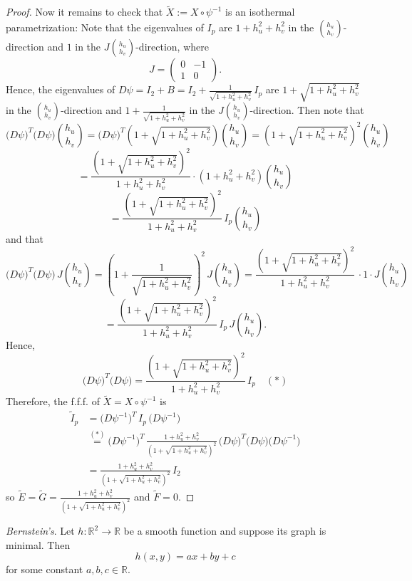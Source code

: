 \begin{proof}
\noindent Now it remains to check that $\widetilde{X} := X\circ\psi^{-1}$ is an isothermal parametrization: Note that the eigenvalues of $I_p$ are $1 + h_u^2 + h_v^2$ in the $\binom{h_u}{h_v}$-direction and $1$ in the $J\binom{h_u}{h_v}$-direction, where
\[
J = \begin{pmatrix}0 & -1\\ 1 & 0\end{pmatrix}.
\]
Hence, the eigenvalues of $D\psi = I_2 + B = I_2 + \frac{1}{\sqrt{1 + h_u^2 + h_v^2}}\,I_p$ are $1 + \sqrt{1 + h_u^2 + h_v^2}$ in the $\binom{h_u}{h_v}$-direction and $1 + \frac{1}{\sqrt{1 + h_u^2 + h_v^2}}$ in the $J\binom{h_u}{h_v}$-direction. Then note that
\[
\big(D\psi\big)^T\big(D\psi\big)\binom{h_u}{h_v} = \big(D\psi\big)^T\left(1 + \sqrt{1 + h_u^2 + h_v^2}\right)\binom{h_u}{h_v} = \left(1 + \sqrt{1 + h_u^2 + h_v^2}\right)^2\binom{h_u}{h_v}
\]
\[
= \frac{\left(1 + \sqrt{1 + h_u^2 + h_v^2}\right)^2}{1 + h_u^2 + h_v^2}\cdot\left(1 + h_u^2 + h_v^2\right)\binom{h_u}{h_v}
\]
\[
= \frac{\left(1 + \sqrt{1 + h_u^2 + h_v^2}\right)^2}{1 + h_u^2 + h_v^2}\,I_p\binom{h_u}{h_v}
\]
and that
\[
\big(D\psi\big)^T\big(D\psi\big)\,J\binom{h_u}{h_v} = \left(1 + \frac{1}{\sqrt{1 + h_u^2 + h_v^2}}\right)^2\,J\binom{h_u}{h_v} = \frac{\left(1 + \sqrt{1 + h_u^2 + h_v^2}\right)^2}{1 + h_u^2 + h_v^2}\, \cdot1\cdot J\binom{h_u}{h_v}
\]
\[
= \frac{\left(1 + \sqrt{1 + h_u^2 + h_v^2}\right)^2}{1 + h_u^2 + h_v^2}\,I_p\,J\binom{h_u}{h_v}.
\]
Hence,
\[
\big(D\psi\big)^T\big(D\psi\big) = \frac{\left(1 + \sqrt{1 + h_u^2 + h_v^2}\right)^2}{1 + h_u^2 + h_v^2}\,I_p \quad (*)
\]
Therefore, the f.f.f. of $\widetilde{X} = X\circ\psi^{-1}$ is
\begin{align*}
    \widetilde{I}_p &= \big(D\psi^{-1}\big)^T\,I_p\,\big(D\psi^{-1}\big)\\
    &\stackrel{(*)}{=} \big(D\psi^{-1}\big)^T\,\frac{1 + h_u^2 + h_v^2}{\left(1 + \sqrt{1 + h_u^2 + h_v^2}\right)^2}\,\big(D\psi\big)^T\big(D\psi\big)\big(D\psi^{-1}\big)\\
    &= \frac{1 + h_u^2 + h_v^2}{\left(1 + \sqrt{1 + h_u^2 + h_v^2}\right)^2}\,I_2
\end{align*}
so $\widetilde{E} = \widetilde{G}=\frac{1 + h_u^2 + h_v^2}{\left(1 + \sqrt{1 + h_u^2 + h_v^2}\right)^2}$ and $\widetilde{F} = 0$.
\end{proof}

\begin{theorem}
\textit{Bernstein's}. Let $h: \mathbb{R}^2\to\mathbb{R}$ be a smooth function and suppose its graph is minimal. Then
\[
h(x, y) = ax + by + c
\]
for some constant $a, b, c\in\mathbb{R}$.
\end{theorem}

